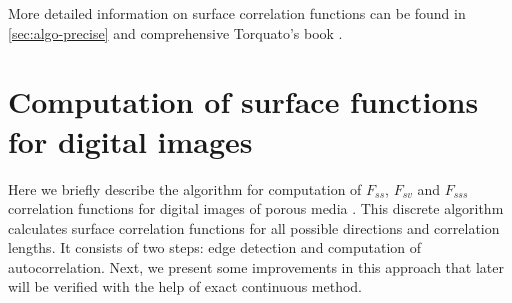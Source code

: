 \documentclass[preprint]{elsarticle}
\begin{document}
More detailed information on surface correlation functions can be found in
\cref{sec:algo-precise} and comprehensive Torquato's book \cite{Torquato_book}.

\section{Computation of surface functions for digital images}
\label{sec:algo}
Here we briefly describe the algorithm for computation of $F_{ss}$, $F_{sv}$ and
$F_{sss}$ correlation functions for digital images of porous media
\cite{Samarin}. This discrete algorithm calculates surface correlation functions
for all possible directions and correlation lengths. It consists of two steps:
edge detection and computation of autocorrelation. Next, we present some
improvements in this approach that later will be verified with the help of exact
continuous method.
\end{document}

